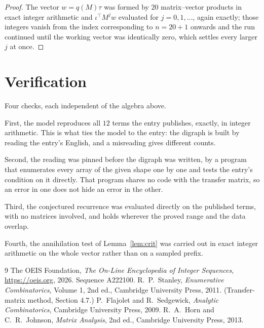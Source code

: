 \documentclass[11pt,a4paper]{article}
\theoremstyle{plain}
\theoremstyle{definition}
\begin{document}
\begin{proof}
The vector $w=q(M)\tau$ was formed by $20$ matrix--vector products in exact integer
arithmetic and $\iota^{\!\top}M^{j}w$ evaluated for $j=0,1,\dots$, again exactly; those
integers vanish from the index corresponding to $n=20+1$ onwards and the run continued
until the working vector was identically zero, which settles every larger $j$ at once.
\end{proof}

\section{Verification}

Four checks, each independent of the algebra above.

First, the model reproduces all $12$ terms the entry publishes, exactly, in integer
arithmetic. This is what ties the model to the entry: the digraph is built by reading the
entry's English, and a misreading gives different counts.

Second, the reading was pinned before the digraph was written, by a program that enumerates
every array of the given shape one by one and tests the entry's condition on it directly. That program shares no code with the transfer matrix, so an error in one does not
hide an error in the other.

Third, the conjectured recurrence was evaluated directly on the published terms, with no
matrices involved, and holds wherever the proved range and the data overlap.

Fourth, the annihilation test of Lemma~\ref{lem:crit} was carried out in exact integer
arithmetic on the whole vector rather than on a sampled prefix.

\begin{thebibliography}{9}
 The OEIS Foundation, \emph{The On-Line Encyclopedia of Integer
Sequences}, \url{https://oeis.org}, 2026. Sequence A222100.
 R.~P.~Stanley, \emph{Enumerative Combinatorics}, Volume 1, 2nd ed.,
Cambridge University Press, 2011. (Transfer-matrix method, Section 4.7.)
 P.~Flajolet and R.~Sedgewick, \emph{Analytic Combinatorics}, Cambridge
University Press, 2009.
 R.~A.~Horn and C.~R.~Johnson, \emph{Matrix Analysis}, 2nd ed., Cambridge
University Press, 2013.
\end{thebibliography}
\end{document}
